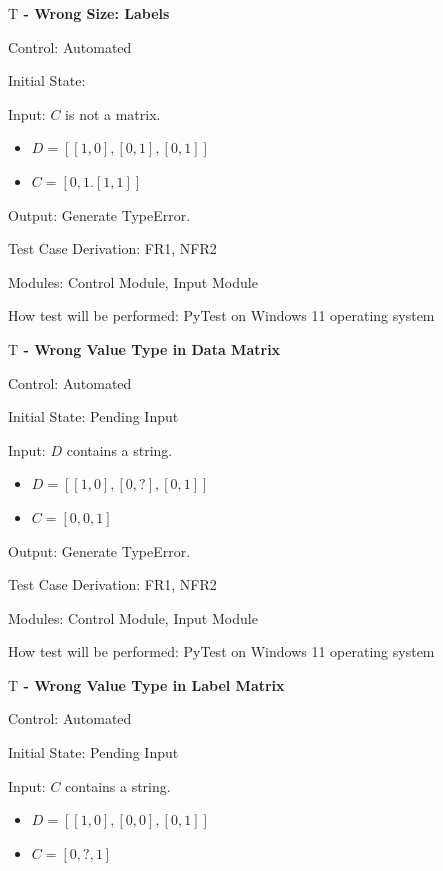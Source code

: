 \documentclass[12pt, titlepage]{article}
\newcounter{testnum} %
\begin{document}
\begin{enumerate}
\item{T\thetestnum \textbf{\label{T:}  
 - Wrong Size: Labels}}

Control: Automated
					
Initial State: 
					
Input: $C$ is not a matrix.
\begin{itemize}
    \item $D = [[1, 0], [0, 1], [0, 1]]$
    \item $C = [0, 1. [1, 1]]$
\end{itemize}
					
Output: Generate TypeError.

Test Case Derivation: FR1, NFR2

Modules: Control Module, Input Module

How test will be performed: PyTest on Windows 11 operating system

\item{T\thetestnum \textbf{\textbf{\label{T:}  
 - Wrong Value Type in Data Matrix}}

Control: Automated
					
Initial State: Pending Input
					
Input: $D$ contains a string.
\begin{itemize}
    \item $D = [[1, 0], [0, ?], [0, 1]]$
    \item $C = [0, 0, 1]$
\end{itemize}
					
Output: Generate TypeError.

Test Case Derivation: FR1, NFR2

Modules: Control Module, Input Module

How test will be performed: PyTest on Windows 11 operating system

\item{T\thetestnum \textbf{\label{T:} 
 - Wrong Value Type in Label Matrix}}

Control: Automated
					
Initial State: Pending Input
					
Input: $C$ contains a string.
\begin{itemize}
    \item $D = [[1, 0], [0, 0], [0, 1]]$
    \item $C = [0, ?, 1]$
\end{itemize}
					
}
\end{enumerate}
\end{document}
